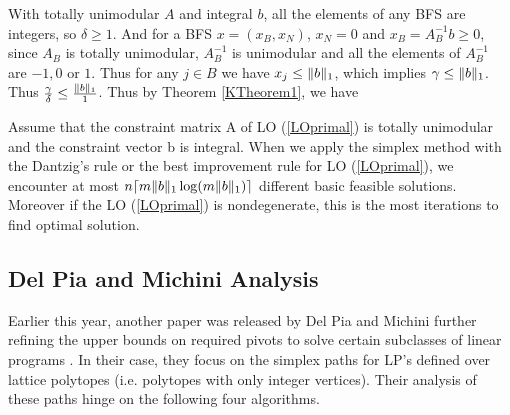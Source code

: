 \documentclass[11pt]{article}
\begin{document}
With totally unimodular $A$ and integral $b$, all the elements of any BFS are integers, so $\delta \ge 1$. And for a BFS $x = (x_B, x_N)$, $x_N = 0$ and $x_B = A_B^{-1}b \ge 0$, since $A_B$ is totally unimodular, $A_B^{-1}$ is unimodular \cite{kitahara2013bound} and all the elements of $A_B^{-1}$ are $-1, 0$ or $1$. Thus for any $j \in B$ we have $x_j \le \lVert b\rVert_1$, which implies $\gamma \le \lVert b\rVert_1$. Thus $\frac{\gamma}{\delta} \le \frac{\lVert b\rVert_1}{1}$. Thus by Theorem \ref{KTheorem1}, we have
\begin{corollary}
Assume that the constraint matrix A of LO (\ref{LOprimal}) is totally unimodular and the constraint vector b is integral. When we apply the simplex method with the Dantzig's rule or the best improvement rule for LO (\ref{LOprimal}), we encounter at most $n\lceil m \lVert b\rVert_1\log(m\lVert b\rVert_1)\rceil$ different basic feasible solutions. Moreover if the LO (\ref{LOprimal}) is nondegenerate, this is the most iterations to find optimal solution. 
\end{corollary}


\subsection{Del Pia and Michini Analysis}
Earlier this year, another paper was released by Del Pia and Michini further refining the upper bounds on required pivots to solve certain subclasses of linear programs \cite{pia}. In their case, they focus on the simplex paths for LP's defined over lattice polytopes (i.e. polytopes with only integer vertices). Their analysis of these paths hinge on the following four algorithms.
\end{document}
